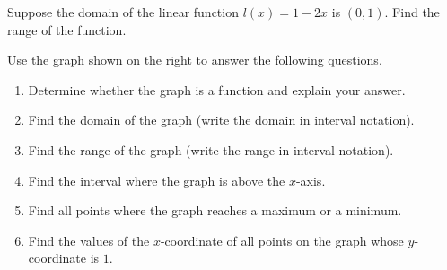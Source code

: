   \begin{exercise}
    Suppose the domain of the linear function $l(x)=1-2x$ is $(0, 1)$. Find the range of the function.
  \end{exercise}
  
  \vfill
  \begin{center}
    \hfill
    \end{center}

\newpage

\begin{exercise}\label{graph}
  Use the graph shown on the right to answer the following questions.
\begin{multicols}{2} 

\begin{enumerate}[label={\textup{(\arabic*)~}}]
\item Determine whether the graph is a function and explain your answer.
\item Find the domain of the graph (write the domain in interval notation).
\item Find the range of the graph (write the range in interval notation).
\item Find the interval where the graph is above the $x$-axis.
\item Find all points where the graph reaches a maximum or a minimum.
\item Find the values of the $x$-coordinate of all points on the graph whose $y$-coordinate is $1$.
\end{enumerate}
\columnbreak

\begin{center}
\end{center}

\end{multicols}
\end{exercise}







